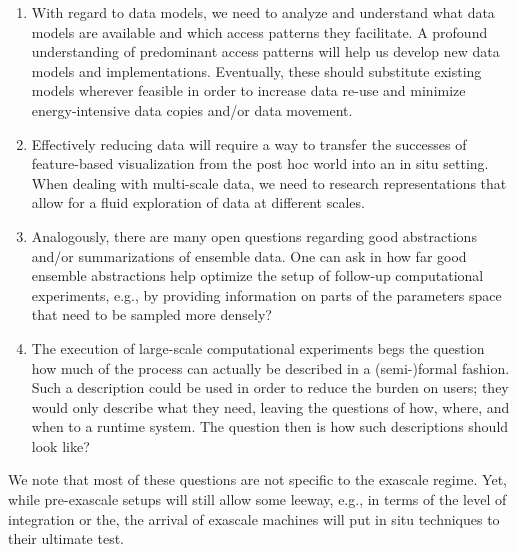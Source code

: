 \begin{enumerate}
    \item With regard to data models, we need to analyze and understand what data models are available and which access patterns they facilitate. 
    A profound understanding of predominant access patterns will help us develop new data models and implementations. 
    Eventually, these should substitute existing models wherever feasible in order to increase data re-use and minimize energy-intensive data copies and/or data movement.
    \item Effectively reducing data will require a way to transfer the successes of feature-based visualization from the post hoc world into an in situ setting. When dealing with multi-scale data, we need to research representations that allow for a fluid exploration of data at different scales. 
    \item Analogously, there are many open questions regarding good abstractions and/or summarizations of ensemble data. 
    One can ask in how far good ensemble abstractions help optimize the setup of follow-up computational experiments, e.g., by providing information on parts of the parameters space that need to be sampled more densely?
    \item The execution of large-scale computational experiments begs the question how much of the process can actually be described in a (semi-)formal fashion. 
    Such a description could be used in order to reduce the burden on users; they would only describe what they need, leaving the questions of how, where, and when to a runtime system. 
    The question then is how such descriptions should look like?
\end{enumerate}

We note that most of these questions are not specific to the exascale regime. 
Yet, while pre-exascale setups will still allow some leeway, e.g., in terms of the level of integration or the, the arrival of exascale machines will put in situ techniques to their ultimate test.


